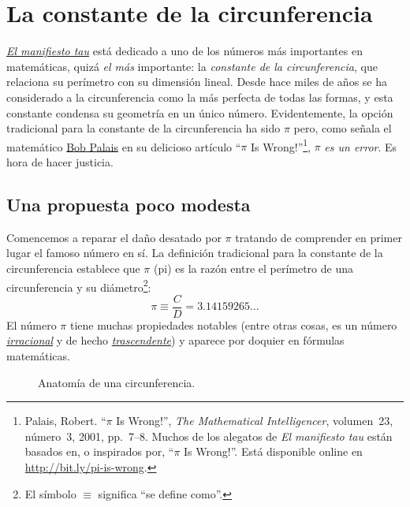 
\section{La constante de la circunferencia} %
\label{sec:the_circle_constant}

\href{http://tauday.com/tau-manifesto}{\emph{El manifiesto tau}} está dedicado a uno de los números más importantes en matemáticas, quizá \emph{el más} importante: la \emph{constante de la circunferencia}, que relaciona su perímetro con su dimensión lineal. Desde hace miles de años se ha considerado a la circunferencia como la más perfecta de todas las formas, y esta constante condensa su geometría en un único número. Evidentemente, la opción tradicional para la constante de la circunferencia ha sido $\pi$ pero, como señala el matemático \href{http://www.math.utah.edu/~palais}{Bob Palais} en su delicioso artículo ``$\pi$ Is Wrong!''\footnote{Palais, Robert. ``$\pi$ Is Wrong!'', \emph{The Mathematical Intelligencer}, volumen~23, número~3, 2001, pp.~7--8. Muchos de los alegatos de \emph{El manifiesto tau} están basados en, o inspirados por, ``$\pi$ Is Wrong!''. Está disponible online en \href{http://www.math.utah.edu/~palais/pi.html}{http://bit.ly/pi-is-wrong}.}, $\pi$ \emph{es un error}. Es hora de hacer justicia.

  \subsection{Una propuesta poco modesta} %
  \label{sec:an_immodest_proposal}

Comencemos a reparar el daño desatado por $\pi$ tratando de comprender en primer lugar el famoso número en sí. La definición tradicional para la constante de la circunferencia establece que $\pi$ (pi) es la razón entre el perímetro de una circunferencia y su diámetro\footnote{El símbolo $\equiv$ significa ``se define como''.}:
\begin{equation}
\label{eq:pi}
\pi \equiv \frac{C}{D} = 3.14159265\ldots
\end{equation}
El número $\pi$ tiene muchas propiedades notables (entre otras cosas, es un número \href{https://es.wikipedia.org/wiki/Número_irracional}{\emph{irracional}} y de hecho \href{https://es.wikipedia.org/wiki/Número_trascendente}{\emph{trascendente}}) y aparece por doquier en fórmulas matemáticas.

\begin{figure}
\caption{Anatomía de una circunferencia.\label{fig:circle}}
\end{figure}

